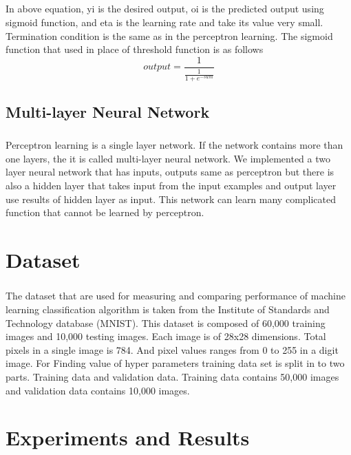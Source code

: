 \documentclass[]{report}
\begin{document}
\paragraph{}In above equation, yi is the desired output, oi is the predicted output using sigmoid function, and eta is the learning rate and take its value very small. Termination condition is the same as in  the perceptron learning. The sigmoid function that used in place of threshold function is as follows
\begin{equation}\label{Sigmoid function}
output = \frac{1}{\frac{1}{1+e^{-sum}}}
\end{equation}
\section{Multi-layer Neural Network}
\paragraph{}Perceptron learning is a single layer network. If the network contains more than one layers, the it is called multi-layer neural network. We implemented a two layer neural network that has inputs, outputs same as perceptron but there is also a hidden layer that takes input from the input examples and output layer use results of hidden layer as input. This network can learn many complicated function that cannot be learned by perceptron.

\chapter{Dataset}
\paragraph{}The dataset that are used for measuring and comparing performance of machine learning classification algorithm is taken from the Institute of Standards and Technology database (MNIST). This dataset is composed of 60,000 training images and 10,000 testing images. Each image is of 28x28 dimensions. Total pixels in a single image is 784. And pixel values ranges from 0 to 255 in a digit image. For Finding value of hyper parameters training data set is split in to two parts. Training data and validation data. Training data contains 50,000 images and validation data contains 10,000 images.
\chapter{Experiments and Results}
\end{document}
